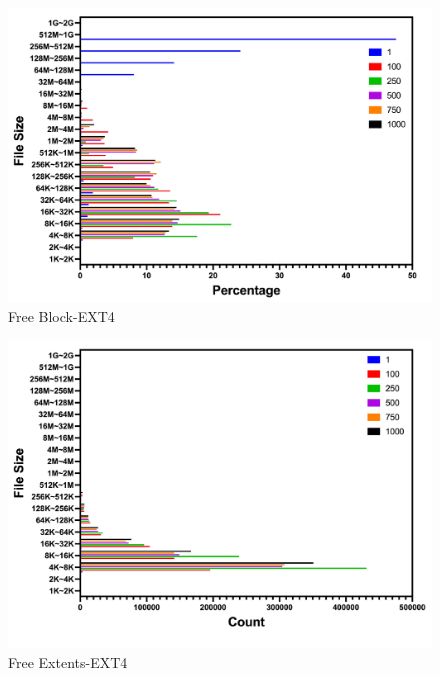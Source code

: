 \begin{figure}[t]
    \centering
	\includegraphics[width=0.95\columnwidth]{graphs/free_block_ext4}
	\caption{Free Block-EXT4}
	\label{f:free_block_ext4}
\end{figure}


\begin{figure}[t]
    \centering
	\includegraphics[width=0.95\columnwidth]{graphs/free_extents_ext4}
	\caption{Free Extents-EXT4}
	\label{f:free_extents_ext4}
\end{figure}

